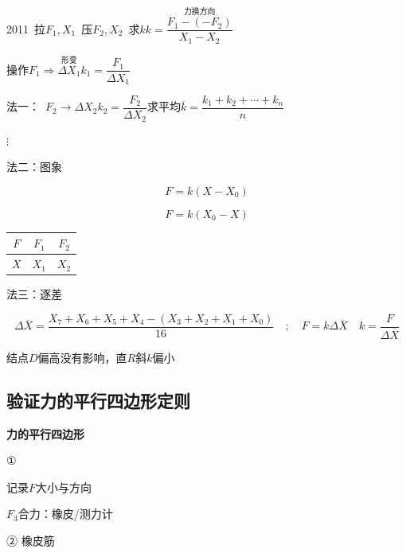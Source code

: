 2011\ 拉$F_1,X_1$\ 压$F_2,X_2$\ 求$k$\qquad $k=\dfrac{\overset{\text{力换方向}}{F_1-(-F_2)}}{X_1-X_2}$

操作\quad $F_1\Rightarrow\overset{\text{形变}}{\Delta X_1}$\qquad $k_1=\dfrac{F_1}{\Delta X_1}$

法一：\ $F_2\to\Delta X_2$\qquad $k_2=\dfrac{F_2}{\Delta X_2}$\qquad 求平均$\overline{k}=\dfrac{k_1+k_2+\cdots+k_n}{n}$

$\vdots$

法二：图象
\begin{keybox}
\[F=k(X-X_0)\]
\end{keybox}


\begin{keybox}
\[F=k(X_0-X)\]
\end{keybox}


\begin{center}
\begin{tabular}{c|c|c|}
$F$ & $F_1$ & $F_2$ \\
\hline
$X$ & $X_1$ & $X_2$ \\
\end{tabular}
\end{center}

法三：逐差

\[
\Delta\overline{X}=\frac{X_7+X_6+X_5+X_4-(X_3+X_2+X_1+X_0)}{16}\quad;\quad F=k\Delta\overline{X}\quad k=\frac{F}{\Delta\overline{X}}
\]

结点$D$偏高没有影响，直$R$斜$k$偏小 %

\subsection{验证力的平行四边形定则}
\textbf{力的平行四边形}

①


记录$F$大小与方向

$F_3$合力：橡皮/测力计

② 橡皮筋

